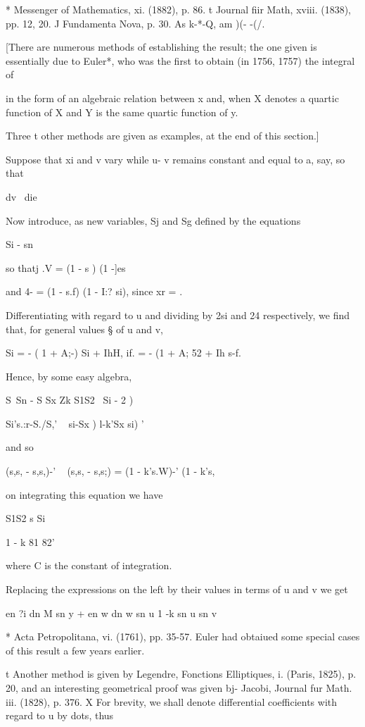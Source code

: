 * Messenger of Mathematics, xi. (1882), p. 86. t Journal fiir Math,
xviii. (1838), pp. 12, 20. J Fundamenta Nova, p. 30. As k-*-Q, am )(-
-(/.

%
%

[There are numerous methods of establishing the result; the one given
is essentially due to Euler*, who was the first to obtain (in 1756,
1757) the integral of

in the form of an algebraic relation between x and, when X denotes a
quartic function of X and Y is the same quartic function of y.

Three t other methods are given as examples, at the end of this
section.]

Suppose that xi and v vary while u- v remains constant and equal to a,
say, so that

dv \ die

Now introduce, as new variables, Sj and Sg defined by the equations

Si - sn %

so thatj .V = (1 - s ) (1 -]es \

and 4- = (1 - s.f) (1 - I:? si), since xr = .

Differentiating with regard to u and dividing by 2si and 24
respectively, we find that, for general values § of u and v,

Si = - ( 1 + A;-) Si + IhH, if. = - (1 + A; 52 + Ih s-f.

Hence, by some easy algebra,

S\ Sn - S Sx Zk S1S2 \ Si - 2 )

Si's.:r-S./S,' ~ si-Sx ) l-k'Sx si) '

and so

(s,s, - s,s,)-' ~ (s,s, - s,s;) = (1 - k's.W)-' (1 - k's,%

on integrating this equation we have

S1S2 s Si

1 - k 81 82'

where C is the constant of integration.

Replacing the expressions on the left by their values in terms of u
and v we get \

en ?i dn M sn y + en w dn w sn u 1 -k sn u sn v

* Acta Petropolitana, vi. (1761), pp. 35-57. Euler had obtaiued some
special cases of this result a few years earlier.

t Another method is given by Legendre, Fonctions Elliptiques, i.
(Paris, 1825), p. 20, and an interesting geometrical proof was given
bj- Jacobi, Journal fur Math. iii. (1828), p. 376. X For brevity, we
shall denote differential coefficients with regard to u by dots, thus

